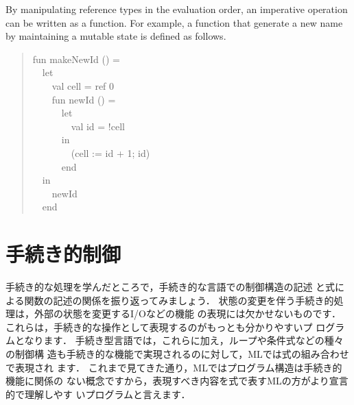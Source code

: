 \documentclass{jbook}
\newif\ifjp
\newcommand{\txt}[2]{#1}
\newcommand{\myem}{\mbox{\ \ }}
\begin{document}
	By manipulating reference types in the evaluation order, 
an imperative operation can be written as a function.
	For example, a function that generate a new name by maintaining
a mutable state is defined as follows.
\begin{tt}
\begin{quote}
fun makeNewId () =\\
\myem let\\
\myem\myem val cell = ref 0\\
\myem\myem fun newId () =\\
\myem\myem\myem let\\
\myem\myem\myem\myem val id = !cell\\
\myem\myem\myem in\\
\myem\myem\myem\myem (cell := id + 1; id)\\
\myem\myem\myem end\\
\myem in\\
\myem\myem newId\\
\myem end
\end{quote}
\end{tt}
\fi%
	
\section{\txt{手続き的制御}{Procedural control}}
\label{sec:tutorialControl}

\ifjp%
	手続き的な処理を学んだところで，手続き的な言語での制御構造の記述
と式による関数の記述の関係を振り返ってみましょう．
	状態の変更を伴う手続き的処理は，外部の状態を変更するI/Oなどの機能
の表現には欠かせないものです．
	これらは，手続き的な操作として表現するのがもっとも分かりやすいプ
ログラムとなります．
	手続き型言語では，これらに加え，ループや条件式などの種々の制御構
造も手続き的な機能で実現されるのに対して，MLでは式の組み合わせで表現され
ます．
	これまで見てきた通り，MLではプログラム構造は手続き的機能に関係の
ない概念ですから，表現すべき内容を式で表すMLの方がより宣言的で理解しやす
いプログラムと言えます．
\end{document}
